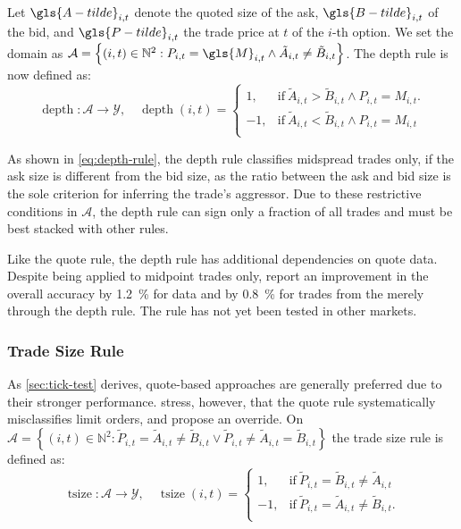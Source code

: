 Let $\gls{A-tilde}_{i,t}$ denote the quoted size of the ask, $\gls{B-tilde}_{i,t}$ of the bid, and $\gls{P-tilde}_{i,t}$ the trade price at $t$ of the $i$-th option. We set the domain as $\mathcal{A} = \left\{(i, t) \in \mathbb{N}^2: P_{i,t} = \gls{M}_{i,t} \land \tilde{A}_{i,t} \neq \tilde{B}_{i,t} \right\}$. The depth rule is now defined as:
\begin{equation}
    \operatorname{depth} \colon \mathcal{A} \to \mathcal{Y},\quad
    \operatorname{depth}(i, t)=
    \begin{cases}
        1,  & \text{if}\ \tilde{A}_{i,t} > \tilde{B}_{i,t} \land P_{i, t} = M_{i, t}. \\
        -1, & \text{if}\ \tilde{A}_{i,t} < \tilde{B}_{i,t} \land P_{i, t} = M_{i, t}  \\
    \end{cases}
    \label{eq:depth-rule}
\end{equation}

As shown in \cref{eq:depth-rule}, the depth rule classifies midspread trades only, if the ask size is different from the bid size, as the ratio between the ask and bid size is the sole criterion for inferring the trade's aggressor. Due to these restrictive conditions in $\mathcal{A}$, the depth rule can sign only a fraction of all trades and must be best stacked with other rules.

Like the quote rule, the depth rule has additional dependencies on quote data. Despite being applied to midpoint trades only, \textcite[][4]{grauerOptionTradeClassification2022} report an improvement in the overall accuracy by \SI{1.2}{\percent} for  data and by \SI{0.8}{\percent} for trades from the  merely through the depth rule. The rule has not yet been tested in other markets.

\subsubsection{Trade Size Rule}\label{sec:trade-size-rule}

As \cref{sec:tick-test} derives, quote-based approaches are generally preferred due to their stronger performance. \textcite[][13]{grauerOptionTradeClassification2022} stress, however, that the quote rule systematically misclassifies limit orders, and propose an override. On $\mathcal{A} = \left\{(i, t) \in \mathbb{N}^2: \tilde{P}_{i,t} = \tilde{A}_{i,t} \neq \tilde{B}_{i,t} \lor \tilde{P}_{i,t} \neq\tilde{A}_{i,t} = \tilde{B}_{i,t} \right\}$ the trade size rule is defined as:
\begin{equation}
    \operatorname{tsize} \colon \mathcal{A} \to \mathcal{Y},\quad
    \operatorname{tsize}(i, t)=
    \begin{cases}
        1,  & \text{if}\ \tilde{P}_{i, t} = \tilde{B}_{i, t} \neq \tilde{A}_{i, t}  \\
        -1, & \text{if}\ \tilde{P}_{i, t} = \tilde{A}_{i, t} \neq \tilde{B}_{i, t}. \\
    \end{cases}
    \label{eq:trade-size-rule}
\end{equation}

